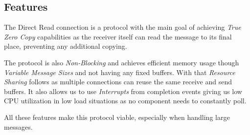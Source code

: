 \subsection{Features}

The Direct Read connection is a protocol with the main goal of achieving  \emph{True Zero Copy} capabilities as 
the receiver itself can read the message to its final place, preventing any additional 
copying. 

The protocol is also \emph{Non-Blocking} and achieves efficient memory usage though \emph{Variable Message Sizes} and not 
having any fixed buffers. With that \emph{Resource Sharing} follows as multiple connections can reuse the same receive and 
send buffers. It also allows us to use \emph{Interrupts} from completion events
giving us low CPU utilization in low load situations as no component needs to constantly poll.

All these features make this protocol viable, especially when handling large messages.
